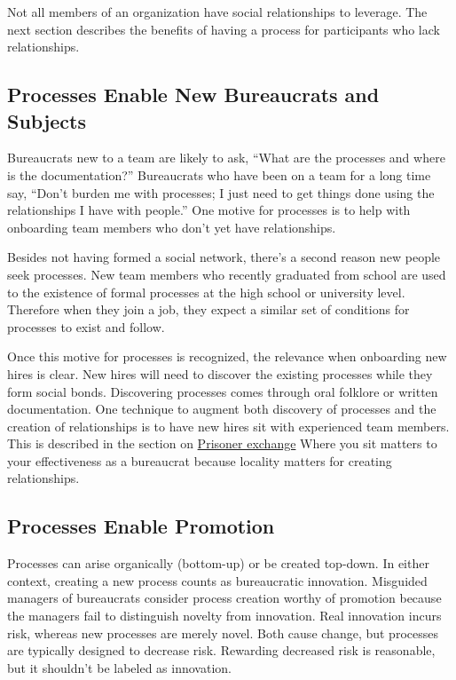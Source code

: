 Not all members of an organization have social relationships to leverage. The next section describes the benefits of having a process for participants who lack relationships.

\subsection*{Processes Enable New Bureaucrats and Subjects}

Bureaucrats new to a team are likely to ask, ``What are the processes and where is the documentation?'' Bureaucrats who have been on a team for a long time say, ``Don't burden me with processes; I just need to get things done using the relationships I have with people.'' One motive for processes is to help with onboarding team members who don't yet have relationships.

Besides not having formed a social network, there's a second reason new people seek processes. New team members who recently graduated from school are used to the existence of formal processes at the high school or university level. Therefore when they join a job, they expect a similar set of conditions for processes to exist and follow.

Once this motive for processes is recognized, the relevance when onboarding new hires is clear. New hires will need to discover the existing processes while they form social bonds. Discovering processes comes through oral folklore or written documentation. One technique to augment both discovery of processes  and the creation of relationships is to have new hires sit with experienced team members.
%
%
This is described in the section on  
\hyperref[sec:prisoner-exchange]{Prisoner exchange}%
\iftoggle{haspagenumbers}{ on page~\pageref{sec:prisoner-exchange}.}{.}
Where you sit matters to your effectiveness as a bureaucrat because locality matters for creating relationships.

\subsection*{Processes Enable Promotion}

Processes can arise organically (bottom-up) or be created top-down. In either context, creating a new process counts as bureaucratic innovation. Misguided managers of bureaucrats consider process creation worthy of promotion because the managers fail to distinguish novelty from innovation. Real innovation incurs risk, whereas new processes are merely novel. Both cause change, but processes are typically designed to decrease risk. Rewarding decreased risk is reasonable, but it shouldn't be labeled as innovation.

